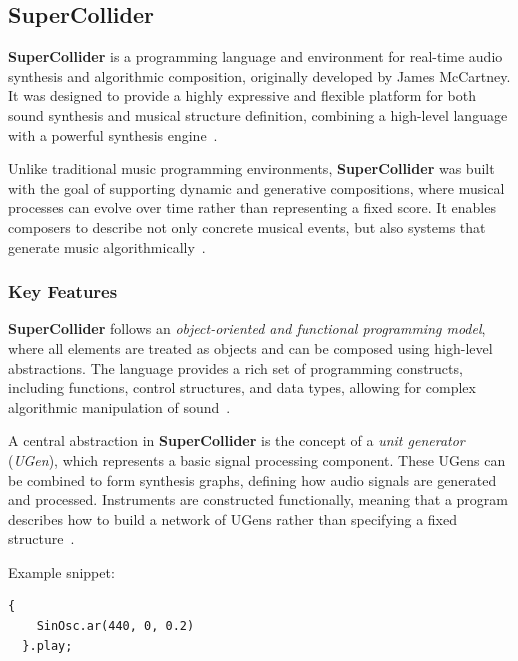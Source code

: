\subsection{SuperCollider}\label{subsec:supercollider}

\textbf{SuperCollider} is a programming language and environment for real-time audio synthesis and algorithmic
composition, originally developed by James McCartney.
It was designed to provide a highly expressive and flexible platform for both sound synthesis and musical structure
definition, combining a high-level language with a powerful synthesis engine~\cite{McCartney_2002}.

Unlike traditional music programming environments, \textbf{SuperCollider} was built with the goal of supporting dynamic
and generative compositions, where musical processes can evolve over time rather than representing a fixed score.
It enables composers to describe not only concrete musical events, but also systems that generate music
algorithmically~\cite{McCartney_2002}.


\subsubsection{Key Features}

\textbf{SuperCollider} follows an \textit{object-oriented and functional programming model}, where all
elements are treated as objects and can be composed using high-level abstractions.
The language provides a rich set of programming constructs, including functions, control structures, and data types,
allowing for complex algorithmic manipulation of sound~\cite{McCartney_2002}.

A central abstraction in \textbf{SuperCollider} is the concept of a \textit{unit generator} (\textit{UGen}),
which represents a basic signal processing component.
These UGens can be combined to form synthesis graphs, defining how audio signals are generated and processed.
Instruments are constructed functionally, meaning that a program describes how to build a network of UGens rather than
specifying a fixed structure~\cite{McCartney_2002}.

Example snippet:

\begin{lstlisting}[label={lst:supercollider-1}]
  {
    SinOsc.ar(440, 0, 0.2)
  }.play;
\end{lstlisting}

